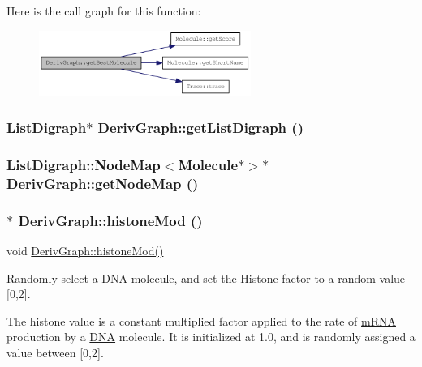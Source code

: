 Here is the call graph for this function:\nopagebreak
\begin{figure}[H]
\begin{center}
\leavevmode
\includegraphics[width=196pt]{classDerivGraph_aaaa9598e55cbd8c55585a0488e940516_cgraph}
\end{center}
\end{figure}
\hypertarget{classDerivGraph_ae657edb3b0bf358f75f498a2d56e0456}{
\subsubsection[{getListDigraph}]{\setlength{\rightskip}{0pt plus 5cm}ListDigraph$\ast$ DerivGraph::getListDigraph ()}}
\label{classDerivGraph_ae657edb3b0bf358f75f498a2d56e0456}
\hypertarget{classDerivGraph_a41cea20de6fd631deeb82f036bc823f4}{
\subsubsection[{getNodeMap}]{\setlength{\rightskip}{0pt plus 5cm}ListDigraph::NodeMap$<${\bf Molecule}$\ast$$>$$\ast$ DerivGraph::getNodeMap ()}}
\label{classDerivGraph_a41cea20de6fd631deeb82f036bc823f4}
\hypertarget{classDerivGraph_ae39d9acba4901f668d8a85c88bfcc21a}{
\subsubsection[{histoneMod}]{ $\ast$ DerivGraph::histoneMod ()}}
\label{classDerivGraph_ae39d9acba4901f668d8a85c88bfcc21a}
void \hyperlink{classDerivGraph_ae39d9acba4901f668d8a85c88bfcc21a}{DerivGraph::histoneMod()}

Randomly select a \hyperlink{classDNA}{DNA} molecule, and set the Histone factor to a random value \mbox{[}0,2\mbox{]}.

The histone value is a constant multiplied factor applied to the rate of \hyperlink{classmRNA}{mRNA} production by a \hyperlink{classDNA}{DNA} molecule. It is initialized at 1.0, and is randomly assigned a value between \mbox{[}0,2\mbox{]}.

